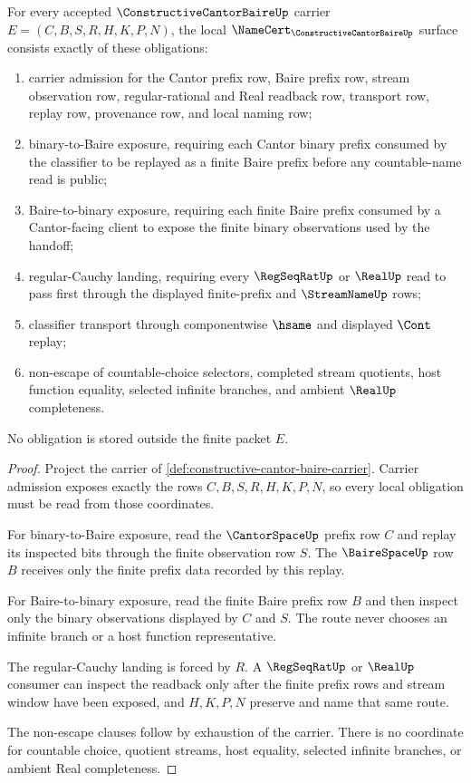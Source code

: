 \begin{theorem}
\label{thm:constructive-cantor-baire-namecert-obligations}
For every accepted $\ConstructiveCantorBaireUp$ carrier $E=(C,B,S,R,H,K,P,N)$, the local $\NameCert_{\ConstructiveCantorBaireUp}$ surface consists exactly of these obligations:
\begin{enumerate}
\item carrier admission for the Cantor prefix row, Baire prefix row, stream observation row, regular-rational and Real readback row, transport row, replay row, provenance row, and local naming row;
\item binary-to-Baire exposure, requiring each Cantor binary prefix consumed by the classifier to be replayed as a finite Baire prefix before any countable-name read is public;
\item Baire-to-binary exposure, requiring each finite Baire prefix consumed by a Cantor-facing client to expose the finite binary observations used by the handoff;
\item regular-Cauchy landing, requiring every $\RegSeqRatUp$ or $\RealUp$ read to pass first through the displayed finite-prefix and $\StreamNameUp$ rows;
\item classifier transport through componentwise $\hsame$ and displayed $\Cont$ replay;
\item non-escape of countable-choice selectors, completed stream quotients, host function equality, selected infinite branches, and ambient $\RealUp$ completeness.
\end{enumerate}
No obligation is stored outside the finite packet $E$.
\end{theorem}
\begin{proof}
Project the carrier of \autoref{def:constructive-cantor-baire-carrier}. Carrier admission exposes exactly the rows $C,B,S,R,H,K,P,N$, so every local obligation must be read from those coordinates.

For binary-to-Baire exposure, read the $\CantorSpaceUp$ prefix row $C$ and replay its inspected bits through the finite observation row $S$. The $\BaireSpaceUp$ row $B$ receives only the finite prefix data recorded by this replay.

For Baire-to-binary exposure, read the finite Baire prefix row $B$ and then inspect only the binary observations displayed by $C$ and $S$. The route never chooses an infinite branch or a host function representative.

The regular-Cauchy landing is forced by $R$. A $\RegSeqRatUp$ or $\RealUp$ consumer can inspect the readback only after the finite prefix rows and stream window have been exposed, and $H,K,P,N$ preserve and name that same route.

The non-escape clauses follow by exhaustion of the carrier. There is no coordinate for countable choice, quotient streams, host equality, selected infinite branches, or ambient Real completeness.
\end{proof}

